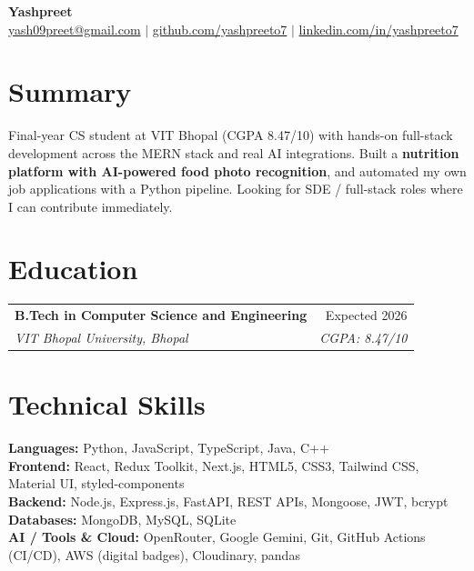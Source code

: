 \documentclass[a4paper,10pt]{article}
\makeatletter
\newcommand{\resumeSubheading}[4]{
  \vspace{1pt}\item
    \begin{tabular*}{\textwidth}{l@{\extracolsep{\fill}}r}
      \textbf{#1} & #2 \\
      \textit{\small#3} & \textit{\small #4} \\
    \end{tabular*}
}
\makeatother
\begin{document}
\begin{center}
\begin{minipage}{0.82\textwidth}
  \centering
  {\LARGE \textbf{Yashpreet}} \\[2pt]
  \href{mailto:yash09preet@gmail.com}{yash09preet@gmail.com}
  $|$
  \href{https://github.com/yashpreeto7}{github.com/yashpreeto7}
  $|$
  \href{https://www.linkedin.com/in/yashpreeto7}{linkedin.com/in/yashpreeto7}
\end{minipage}
\end{center}


\section{Summary}
\vspace{-4pt}
\begin{flushleft}
\normalsize Final-year CS student at VIT Bhopal (CGPA 8.47/10) with hands-on full-stack development across the
MERN stack and real AI integrations. Built a \textbf{nutrition platform with AI-powered food
photo recognition}, and automated my own job applications with a Python pipeline. Looking for SDE /
full-stack roles where I can contribute immediately.
\end{flushleft}


\section{Education}
\vspace{-4pt}
\begin{flushleft}
  \hspace{1.5em}
  \resumeSubheading
    {B.Tech in Computer Science and Engineering}{Expected 2026}
    {VIT Bhopal University, Bhopal}{CGPA: 8.47/10}
\end{flushleft}


\section{Technical Skills}
\vspace{-4pt}
\hspace{1.5em}
\begin{flushleft}
\textbf{Languages:} Python, JavaScript, TypeScript, Java, C++ \\[4pt]
\textbf{Frontend:} React, Redux Toolkit, Next.js, HTML5, CSS3, Tailwind CSS, Material UI, styled-components \\[4pt]
\textbf{Backend:} Node.js, Express.js, FastAPI, REST APIs, Mongoose, JWT, bcrypt \\[4pt]
\textbf{Databases:} MongoDB, MySQL, SQLite \\[4pt]
\textbf{AI / Tools \& Cloud:} OpenRouter, Google Gemini, Git, GitHub Actions (CI/CD), AWS (digital badges), Cloudinary, pandas
\end{flushleft}
\end{document}
